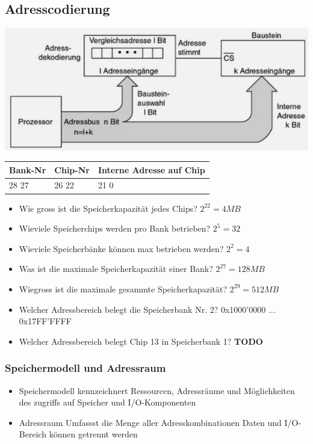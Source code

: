 \subsection{Adresscodierung}
\begin{minipage}{0.5\linewidth}
    \includegraphics[width=\textwidth]{images/SystembusSpeicherSpeichersystem/SpeicherSysAdressBus}
\end{minipage}
\begin{minipage}{0.5\linewidth}
    \begin{tabular}{|l|l|l|}
        \hline
        Bank-Nr         & Chip-Nr       & Interne Adresse auf Chip\\
        \hline
        28 \hfill 27    & 26 \hfill 22  & 21 \hfill 0\\
    \end{tabular}
    \begin{itemize}
        \item Wie gross ist die Speicherkapazität jedes Chips?
        \subitem $ 2^{22}  = 4MB$
        \item Wieviele Speicherchips werden pro Bank betrieben?
        \subitem $ 2^5 =32$
        \item Wieviele Speicherbänke können max betrieben werden?
        \subitem $ 2^2=4 $
        \item Was ist die maximale Speicherkapazität einer Bank?
        \subitem $ 2^{27}=128MB $
        \item Wiegross ist die maximale gesammte Speicherkapazität?
        \subitem $ 2^{29}=512MB $    
        \item Welcher Adressbereich belegt die Speicherbank Nr. 2?
        \subitem 0x1000'0000 ... 0x17FF'FFFF
        \item Welcher Adressbereich belegt Chip 13 in Speicherbank 1?
        \subitem \textbf{TODO} %
    \end{itemize}
\end{minipage}

\subsubsection{Speichermodell und Adressraum}
\begin{itemize}
    \item Speichermodell
    \subitem kennzeichnert Ressourcen, Adressräume und Möglichkeiten des zugriffs auf Speicher und I/O-Komponenten
    \item Adressraum
    \subitem Umfassst die Menge aller Adresskombinationen
    \subitem Daten und I/O-Bereich können getrennt werden
\end{itemize}

